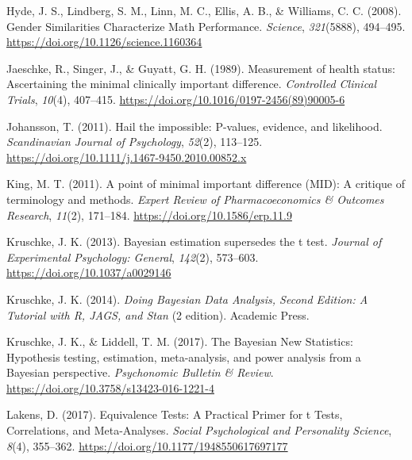 \documentclass[
  letterpaper,
  DIV=11,
  numbers=noendperiod]{scrreprt}
\newlength{\cslhangindent}
\newlength{\cslentryspacingunit} %
\newenvironment{CSLReferences}[2] %
 {%
  \setlength{\parindent}{0pt}
  \ifodd #1
  \let\oldpar\par
  \def\par{\hangindent=\cslhangindent\oldpar}
  \fi
  \setlength{\parskip}{#2\cslentryspacingunit}
 }%
 {}
\begin{document}
\begin{CSLReferences}{1}{0}
\leavevmode{}%
Hyde, J. S., Lindberg, S. M., Linn, M. C., Ellis, A. B., \& Williams, C.
C. (2008). Gender {Similarities Characterize Math Performance}.
\emph{Science}, \emph{321}(5888), 494--495.
\url{https://doi.org/10.1126/science.1160364}

\leavevmode{}%
Jaeschke, R., Singer, J., \& Guyatt, G. H. (1989). Measurement of health
status: {Ascertaining} the minimal clinically important difference.
\emph{Controlled Clinical Trials}, \emph{10}(4), 407--415.
\url{https://doi.org/10.1016/0197-2456(89)90005-6}

\leavevmode{}%
Johansson, T. (2011). Hail the impossible: P-values, evidence, and
likelihood. \emph{Scandinavian Journal of Psychology}, \emph{52}(2),
113--125. \url{https://doi.org/10.1111/j.1467-9450.2010.00852.x}

\leavevmode{}%
King, M. T. (2011). A point of minimal important difference ({MID}): A
critique of terminology and methods. \emph{Expert Review of
Pharmacoeconomics \& Outcomes Research}, \emph{11}(2), 171--184.
\url{https://doi.org/10.1586/erp.11.9}

\leavevmode{}%
Kruschke, J. K. (2013). Bayesian estimation supersedes the t test.
\emph{Journal of Experimental Psychology: General}, \emph{142}(2),
573--603. \url{https://doi.org/10.1037/a0029146}

\leavevmode{}%
Kruschke, J. K. (2014). \emph{Doing {Bayesian Data Analysis}, {Second
Edition}: {A Tutorial} with {R}, {JAGS}, and {Stan}} (2 edition).
{Academic Press}.

\leavevmode{}%
Kruschke, J. K., \& Liddell, T. M. (2017). The {Bayesian New
Statistics}: {Hypothesis} testing, estimation, meta-analysis, and power
analysis from a {Bayesian} perspective. \emph{Psychonomic Bulletin \&
Review}. \url{https://doi.org/10.3758/s13423-016-1221-4}

\leavevmode{}%
Lakens, D. (2017). Equivalence {Tests}: {A Practical Primer} for t
{Tests}, {Correlations}, and {Meta-Analyses}. \emph{Social Psychological
and Personality Science}, \emph{8}(4), 355--362.
\url{https://doi.org/10.1177/1948550617697177}


\end{CSLReferences}
\end{document}
